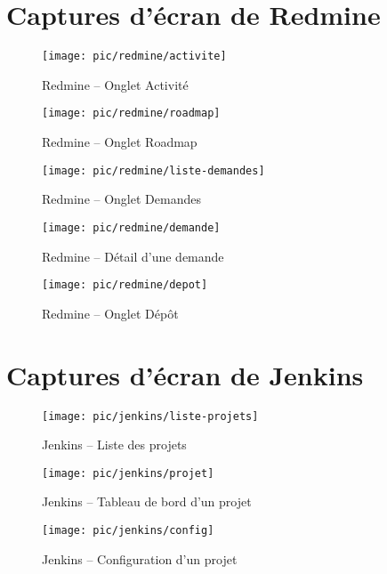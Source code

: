 \appendix

\chapter{Captures d'écran de Redmine}
\label{annexe:redmine}

\begin{figure}[h]
	\centering
	\texttt{[image: pic/redmine/activite]}
	\caption{Redmine -- Onglet \og Activité \fg}
\end{figure}

\begin{figure}
	\centering
	\texttt{[image: pic/redmine/roadmap]}
	\caption{Redmine -- Onglet \og Roadmap \fg}
\end{figure}

\begin{figure}
	\centering
	\texttt{[image: pic/redmine/liste-demandes]}
	\caption{Redmine -- Onglet \og Demandes \fg}
\end{figure}

\begin{figure}
	\centering
	\texttt{[image: pic/redmine/demande]}
	\caption{Redmine -- Détail d'une demande}
\end{figure}

\begin{figure}
	\centering
	\texttt{[image: pic/redmine/depot]}
	\caption{Redmine -- Onglet \og Dépôt \fg}
\end{figure}


\chapter{Captures d'écran de Jenkins}
\label{annexe:jenkins}

\begin{figure}[h]
	\centering
	\texttt{[image: pic/jenkins/liste-projets]}
	\caption{Jenkins -- Liste des projets}
\end{figure}

\begin{figure}
	\centering
	\texttt{[image: pic/jenkins/projet]}
	\caption{Jenkins -- Tableau de bord d'un projet}
\end{figure}

\begin{figure}
	\centering
	\texttt{[image: pic/jenkins/config]}
	\caption{Jenkins -- Configuration d'un projet}
\end{figure}

